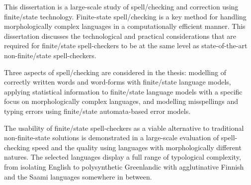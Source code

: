 This dissertation is a large-scale study of spell\-/checking and correction
using finite\-/state technology. Finite-state spell\-/checking is a key method
for handling morphologically complex languages in a computationally
efficient manner. This dissertation discusses the technological and practical
considerations that are required for finite\-/state spell-checkers to be at
the same level as state-of-the-art non-finite\-/state spell-checkers. 

Three aspects of spell\-/checking are considered in the thesis: modelling of
correctly written words and word-forms with finite\-/state language
models, applying statistical information to finite\-/state language models
with a specific focus on morphologically complex languages, and modelling
misspellings and typing errors using finite\-/state automata-based error
models.

The usability of finite\-/state spell-checkers as a viable alternative to
traditional non-finite-state solutions is demonstrated in a large-scale
evaluation of spell-checking speed and the quality using languages with
morphologically different natures. The selected languages display a
full range of typological complexity, from isolating English to
polysynthetic Greenlandic with agglutinative Finnish and the Saami languages
somewhere in between.
